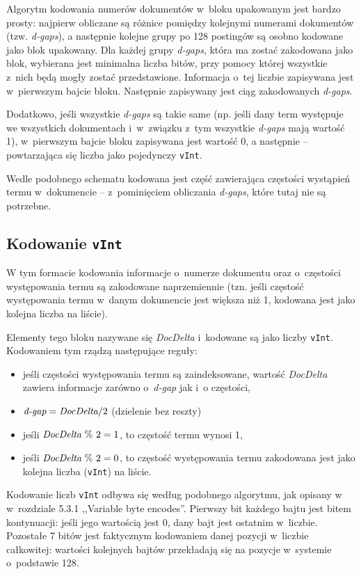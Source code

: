 Algorytm kodowania numerów dokumentów w~bloku upakowanym jest bardzo prosty: najpierw obliczane są różnice pomiędzy kolejnymi numerami dokumentów (tzw. \emph{d-gaps}), a następnie kolejne grupy po 128 postingów są osobno kodowane jako blok upakowany. Dla każdej grupy \emph{d-gaps}, która ma zostać zakodowana jako blok, wybierana jest minimalna liczba bitów, przy pomocy której wszystkie z~nich będą mogły zostać przedstawione. Informacja o~tej liczbie zapisywana jest w~pierwszym bajcie bloku. Następnie zapisywany jest ciąg zakodowanych \emph{d-gaps}.

Dodatkowo, jeśli wszystkie \emph{d-gaps} są takie same (np. jeśli dany term występuje we wszystkich dokumentach i~w~związku z~tym wszystkie \emph{d-gaps} mają wartość 1), w~pierwszym bajcie bloku zapisywana jest wartość 0, a następnie -- powtarzająca się liczba jako pojedynczy \texttt{vInt}.

Wedle podobnego schematu kodowana jest część zawierająca częstości wystąpień termu w~dokumencie -- z~pominięciem obliczania \emph{d-gaps}, które tutaj nie są potrzebne.

\subsection{Kodowanie \texttt{vInt}}
\label{sec:vIntEncoding}

W tym formacie kodowania informacje o~numerze dokumentu oraz o~częstości występowania termu są zakodowane naprzemiennie (tzn. jeśli częstość występowania termu w~danym dokumencie jest większa niż 1, kodowana jest jako kolejna liczba na liście). 

Elementy tego bloku nazywane się \emph{DocDelta} i~kodowane są jako liczby \texttt{vInt}. Kodowaniem tym rządzą następujące reguły:
\begin{itemize}
 \item jeśli częstości występowania termu są zaindeksowane, wartość \emph{DocDelta} zawiera informacje zarówno o~\emph{d-gap} jak i~o częstości,
 \item $\emph{d-gap} = \emph{DocDelta} / 2$ (dzielenie bez reszty)
 \item jeśli $\emph{DocDelta}~\%~2 = 1$, to częstość termu wynosi 1,
 \item jeśli $\emph{DocDelta}~\%~2 = 0$, to częstość występowania termu zakodowana jest jako kolejna liczba (\texttt{vInt}) na liście.
\end{itemize}

Kodowanie liczb \texttt{vInt} odbywa się według podobnego algorytmu, jak opisany w~\cite{irbook} w~rozdziale 5.3.1 ,,Variable byte encodes''. Pierwszy bit każdego bajtu jest bitem kontynuacji: jeśli jego wartością jest 0, dany bajt jest ostatnim w~liczbie. Pozostałe 7 bitów jest faktycznym kodowaniem danej pozycji w~liczbie całkowitej: wartości kolejnych bajtów przekładają się na pozycje w~systemie o~podstawie 128.